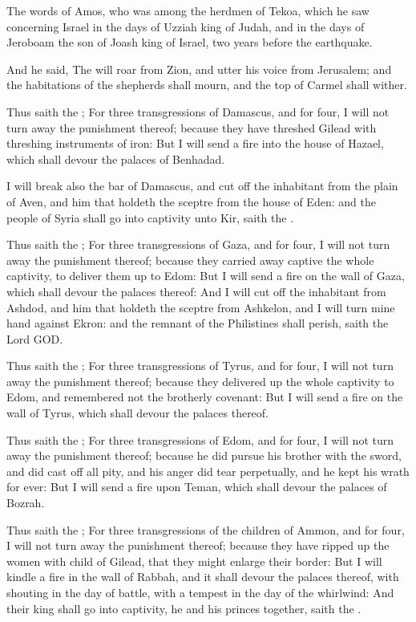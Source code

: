 \Chapter
\Verse The words of Amos, who was among the herdmen of Tekoa, which he saw concerning Israel in the days of Uzziah king of Judah, and in the days of Jeroboam the son of Joash king of Israel, two years before the earthquake.

\Verse And he said, The \LORD will roar from Zion, and utter his voice from Jerusalem; and the habitations of the shepherds shall mourn, and the top of Carmel shall wither.

\Verse Thus saith the \LORD; For three transgressions of Damascus, and for four, I will not turn away the punishment thereof; because they have threshed Gilead with threshing instruments of iron: \Verse But I will send a fire into the house of Hazael, which shall devour the palaces of Benhadad.

\Verse I will break also the bar of Damascus, and cut off the inhabitant from the plain of Aven, and him that holdeth the sceptre from the house of Eden: and the people of Syria shall go into captivity unto Kir, saith the \LORD.

\Verse Thus saith the \LORD; For three transgressions of Gaza, and for four, I will not turn away the punishment thereof; because they carried away captive the whole captivity, to deliver them up to Edom: \Verse But I will send a fire on the wall of Gaza, which shall devour the palaces thereof: \Verse And I will cut off the inhabitant from Ashdod, and him that holdeth the sceptre from Ashkelon, and I will turn mine hand against Ekron: and the remnant of the Philistines shall perish, saith the Lord GOD.

\Verse Thus saith the \LORD; For three transgressions of Tyrus, and for four, I will not turn away the punishment thereof; because they delivered up the whole captivity to Edom, and remembered not the brotherly covenant: \Verse But I will send a fire on the wall of Tyrus, which shall devour the palaces thereof.

\Verse Thus saith the \LORD; For three transgressions of Edom, and for four, I will not turn away the punishment thereof; because he did pursue his brother with the sword, and did cast off all pity, and his anger did tear perpetually, and he kept his wrath for ever: \Verse But I will send a fire upon Teman, which shall devour the palaces of Bozrah.

\Verse Thus saith the \LORD; For three transgressions of the children of Ammon, and for four, I will not turn away the punishment thereof; because they have ripped up the women with child of Gilead, that they might enlarge their border: \Verse But I will kindle a fire in the wall of Rabbah, and it shall devour the palaces thereof, with shouting in the day of battle, with a tempest in the day of the whirlwind: \Verse And their king shall go into captivity, he and his princes together, saith the \LORD.


